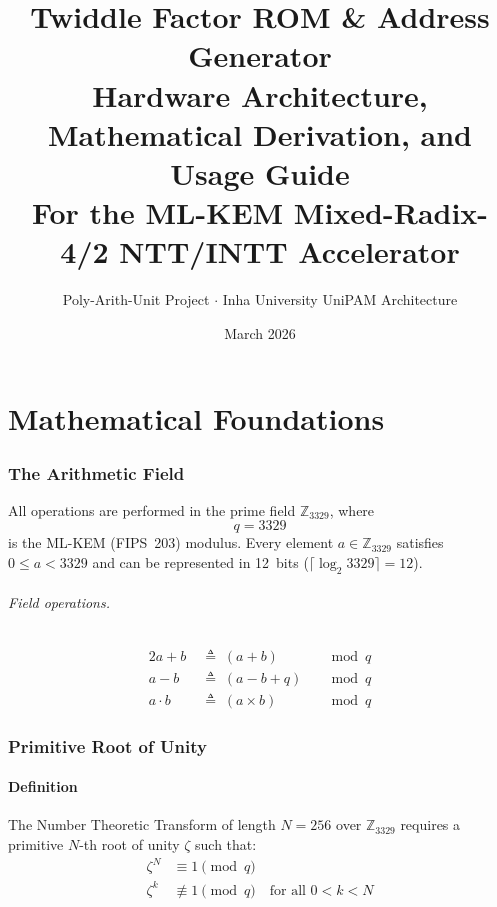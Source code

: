 \documentclass[11pt,a4paper]{article}
\title{%
  \textbf{Twiddle Factor ROM \& Address Generator}\\[0.3em]
  \large Hardware Architecture, Mathematical Derivation, and Usage Guide\\[0.3em]
  \normalsize For the ML-KEM Mixed-Radix-4/2 NTT/INTT Accelerator
}
\author{Poly-Arith-Unit Project $\cdot$ Inha University UniPAM Architecture}
\date{March 2026}
\newcommand{\Zq}{\mathbb{Z}_{3329}}
\begin{document}
\maketitle
\tableofcontents
\newpage

\part{Mathematical Foundations}

\section{The Arithmetic Field}

All operations are performed in the prime field $\Zq$, where
\begin{equation}
  q = 3329
\end{equation}
is the ML-KEM (FIPS~203) modulus. Every element $a \in \Zq$ satisfies $0 \le a < 3329$ and can be represented in 12~bits ($\lceil \log_2 3329 \rceil = 12$).

\paragraph{Field operations.}
\begin{alignat}{2}
  a + b   &\;\triangleq\; (a + b) &&\bmod q \\
  a - b   &\;\triangleq\; (a - b + q) &&\bmod q \\
  a \cdot b &\;\triangleq\; (a \times b) &&\bmod q
\end{alignat}

\section{Primitive Root of Unity}

\subsection{Definition}

The Number Theoretic Transform of length $N = 256$ over $\Zq$ requires a primitive $N$-th root of unity $\zeta$ such that:
\begin{align}
  \zeta^{N} &\equiv 1 \pmod{q} \label{eq:root-unity}\\
  \zeta^{k} &\not\equiv 1 \pmod{q} \quad \text{for all } 0 < k < N \label{eq:primitive}
\end{align}
\end{document}
